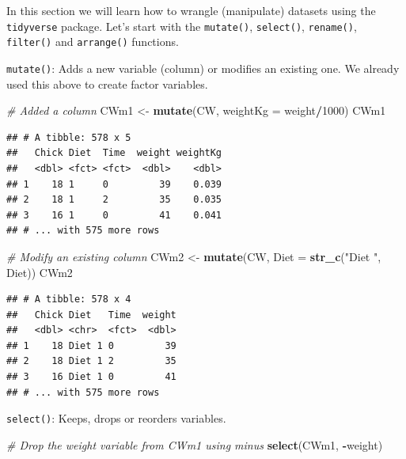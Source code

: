 \documentclass[]{book}
\newenvironment{Shaded}{\begin{snugshade}}{\end{snugshade}}
\newcommand{\CommentTok}[1]{\textcolor[rgb]{0.56,0.35,0.01}{\textit{#1}}}
\newcommand{\DataTypeTok}[1]{\textcolor[rgb]{0.13,0.29,0.53}{#1}}
\newcommand{\DecValTok}[1]{\textcolor[rgb]{0.00,0.00,0.81}{#1}}
\newcommand{\KeywordTok}[1]{\textcolor[rgb]{0.13,0.29,0.53}{\textbf{#1}}}
\newcommand{\NormalTok}[1]{#1}
\newcommand{\OperatorTok}[1]{\textcolor[rgb]{0.81,0.36,0.00}{\textbf{#1}}}
\newcommand{\StringTok}[1]{\textcolor[rgb]{0.31,0.60,0.02}{#1}}
\theoremstyle{definition}
\theoremstyle{definition}
\theoremstyle{definition}
\theoremstyle{remark}
\begin{document}
In this section we will learn how to wrangle (manipulate) datasets using the \texttt{tidyverse}
package. Let's start with the \texttt{mutate()}, \texttt{select()}, \texttt{rename()}, \texttt{filter()} and \texttt{arrange()}
functions.

\texttt{mutate()}: Adds a new variable (column) or modifies an existing one. We already used this above to create
factor variables.

\begin{Shaded}
\begin{Highlighting}[]
\CommentTok{# Added a column}
\NormalTok{CWm1 <-}\StringTok{ }\KeywordTok{mutate}\NormalTok{(CW, }\DataTypeTok{weightKg =}\NormalTok{ weight}\OperatorTok{/}\DecValTok{1000}\NormalTok{)}
\NormalTok{CWm1}
\end{Highlighting}
\end{Shaded}

\begin{verbatim}
## # A tibble: 578 x 5
##   Chick Diet  Time  weight weightKg
##   <dbl> <fct> <fct>  <dbl>    <dbl>
## 1    18 1     0         39    0.039
## 2    18 1     2         35    0.035
## 3    16 1     0         41    0.041
## # ... with 575 more rows
\end{verbatim}

\begin{Shaded}
\begin{Highlighting}[]
\CommentTok{# Modify an existing column}
\NormalTok{CWm2 <-}\StringTok{ }\KeywordTok{mutate}\NormalTok{(CW, }\DataTypeTok{Diet =} \KeywordTok{str_c}\NormalTok{(}\StringTok{"Diet "}\NormalTok{, Diet))}
\NormalTok{CWm2}
\end{Highlighting}
\end{Shaded}

\begin{verbatim}
## # A tibble: 578 x 4
##   Chick Diet   Time  weight
##   <dbl> <chr>  <fct>  <dbl>
## 1    18 Diet 1 0         39
## 2    18 Diet 1 2         35
## 3    16 Diet 1 0         41
## # ... with 575 more rows
\end{verbatim}

\texttt{select()}: Keeps, drops or reorders variables.

\begin{Shaded}
\begin{Highlighting}[]
\CommentTok{# Drop the weight variable from CWm1 using minus}
\KeywordTok{select}\NormalTok{(CWm1, }\OperatorTok{-}\NormalTok{weight)}
\end{Highlighting}
\end{Shaded}
\end{document}
